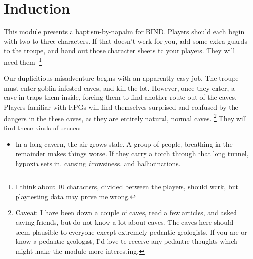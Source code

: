 \section{Induction}

\begin{multicols}{2}

\noindent
This module presents a baptism-by-napalm for BIND.
Players should each begin with two to three characters.
If that doesn't work for you, add some extra \glspl{guard} to the troupe, and hand out those character sheets to your players.
They will need them!%
\footnote{I think about 10 characters, divided between the players, should work, but playtesting data may prove me wrong.}

Our duplicitious misadventure begins with an apparently easy job.
The troupe must enter goblin-infested caves, and kill the lot.
However, once they enter, a cave-in traps them inside, forcing them to find another route out of the caves.
Players familiar with RPGs will find themselves surprised and confused by the dangers in the these caves, as they are entirely natural, normal caves.%
\footnote{Caveat: I have been down a couple of caves, read a few articles, and asked caving friends, but do not know a lot about caves.
The caves here should seem plausible to everyone except extremely pedantic geologists.
If you are or know a pedantic geologist, I'd love to receive any pedantic thoughts which might make the module more interesting.}
They will find these kinds of scenes:

\begin{itemize}
	\item
	In a long cavern, the air grows stale.
	A group of people, breathing in the remainder makes things worse.
	If they carry a torch through that long tunnel, hypoxia sets in, causing drowsiness, and hallucinations.


\end{itemize}
\end{multicols}
